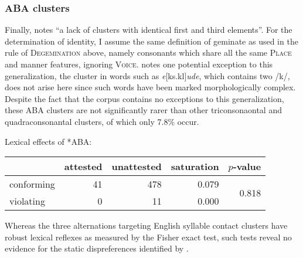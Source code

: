 
\subsubsection{ABA clusters}

Finally, \citet[][176]{Pierrehumbert1994} notes ``a lack of clusters with identical first and third elements''. For the determination of identity, I assume the same definition of geminate as used in the rule of \textsc{Degemination} above, namely consonants which share all the same \textsc{Place} and manner features, ignoring \textsc{Voice}. 
\citeauthor{Pierrehumbert1994} notes one potential exception to this generalization, the cluster in words such as \emph{e}[ks.kl]\emph{ude}, which contains two /k/, does not arise here since such words have been marked morphologically complex. Despite the fact that the corpus contains no exceptions to this generalization, these \textsc{ABA} clusters are not significantly rarer than other triconsonaontal and quadraconsonantal clusters, of which only 7.8\% occur. 

\begin{example}
Lexical effects of \textsc{*ABA}: 

\vspace{0.5\baselineskip}
\begin{tabular}{l r r r r}
\toprule
           & attested & unattested & saturation & $p$-value \\
\midrule
conforming & 41 & 478 & 0.079 & \multirow{2}{*}{0.818} \\
violating  &  0 &  11 & 0.000 \\
\bottomrule
\end{tabular}
\end{example}

Whereas the three alternations targeting English syllable contact clusters have robust lexical reflexes as measured by the Fisher exact test, such tests reveal no evidence for the static dispreferences identified by \citeauthor{Pierrehumbert1994}.

